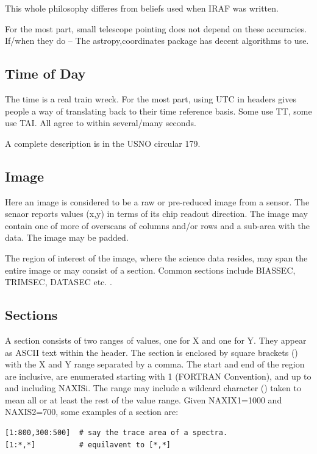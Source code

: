 This whole philosophy differes from beliefs used when IRAF was written.

For the most part, small telescope pointing does not depend on these
accuracies. If/when they do -- The astropy,coordinates package has
decent algorithms to use.

\subsection{Time of Day}

The time is a real train wreck. For the most part, using UTC in headers
gives people a way of translating back to their time reference basis.
Some use TT, some use TAI. All agree to within several/many seconds.

A complete description is in the USNO circular 179. 

\subsection{Image}

Here an image is considered to be a raw or pre-reduced image from a sensor.
The senaor reports values (x,y) in terms of its chip readout direction. The
image may contain one of more of overscans of columns and/or rows and a
sub-area with the data. The image may be padded. 

The region of interest of the image, where the science data resides, may
span the entire image or may consist of a section. Common sections include
BIASSEC, TRIMSEC, DATASEC etc.   
.

\subsection{Sections}

A section consists of two ranges of values, one for X and one for Y. They
appear as ASCII text within the header. The section is enclosed by square
brackets (\dhl{[]}) with the X and Y range separated by a comma. The
start and end of the region are inclusive, are enumerated starting with
1 (FORTRAN Convention), and up to and including NAXISi. The range may include
a wildcard character (\dhl{*}) taken to mean all or at least the rest of
the value range. Given NAXIX1=1000 and NAXIS2=700, some examples of a
section are:

\begingroup \fontsize{10pt}{10pt}
\selectfont
\begin{verbatim} 
[1:800,300:500]  # say the trace area of a spectra.
[1:*,*]          # equilavent to [*,*]
\end{verbatim}
\endgroup

